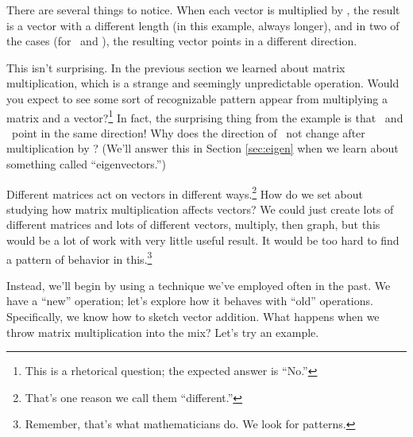 There are several things to notice. When each vector is multiplied by \tta, the result is a vector with a different length (in this example, always longer), and in two of the cases (for \vy\ and \vz), the resulting vector points in a different direction. 

This isn't surprising. In the previous section we learned about matrix multiplication, which is a strange and seemingly unpredictable operation. Would you expect to see some sort of recognizable pattern appear from multiplying a matrix and a vector?\footnote{This is a rhetorical question; the expected answer is ``No.''} In fact, the surprising thing from the example is that \vx\ and \tta\vx\ point in the same direction! Why does the direction of \vx\ not change after multiplication by \tta? (We'll answer this in Section \ref{sec:eigen} when we learn about something called ``eigenvectors.'')


Different matrices act on vectors in different ways.\footnote{That's one reason we call them ``different.''} How do we set about studying how matrix multiplication affects vectors? We could just create lots of different matrices and lots of different vectors, multiply, then graph, but this would be a lot of work with very little useful result. It would be too hard to find a pattern of behavior in this.\footnote{Remember, that's what mathematicians do. We look for patterns.}

Instead, we'll begin by using a technique we've employed often in the past. We have a ``new'' operation; let's explore how it behaves with ``old'' operations. Specifically, we know how to sketch vector addition. What happens when we throw matrix multiplication into the mix? Let's try an example.\\

